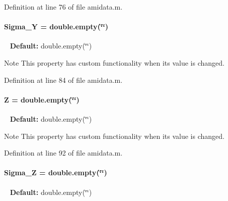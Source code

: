 Definition at line 76 of file amidata.\+m.

\hypertarget{classamidata_a4bd82fb17b03a0039c2f0347ec8dc393}{}
\paragraph[{Sigma\+\_\+\+Y}]{\setlength{\rightskip}{0pt plus 5cm}Sigma\+\_\+\+Y = double.\+empty(\char`\"{}\char`\"{})}\label{classamidata_a4bd82fb17b03a0039c2f0347ec8dc393}
~\newline
{\bfseries Default\+:} double.\+empty(\char`\"{}\char`\"{})

\begin{DoxyNote}{Note}
This property has custom functionality when its value is changed. 
\end{DoxyNote}


Definition at line 84 of file amidata.\+m.

\hypertarget{classamidata_adc18d83abfd9f87d396e8fd6b6ac0fe1}{}
\paragraph[{Z}]{\setlength{\rightskip}{0pt plus 5cm}Z = double.\+empty(\char`\"{}\char`\"{})}\label{classamidata_adc18d83abfd9f87d396e8fd6b6ac0fe1}
~\newline
{\bfseries Default\+:} double.\+empty(\char`\"{}\char`\"{})

\begin{DoxyNote}{Note}
This property has custom functionality when its value is changed. 
\end{DoxyNote}


Definition at line 92 of file amidata.\+m.

\hypertarget{classamidata_a77b1f0ddcfbfb895b17d62a414d35673}{}
\paragraph[{Sigma\+\_\+\+Z}]{\setlength{\rightskip}{0pt plus 5cm}Sigma\+\_\+\+Z = double.\+empty(\char`\"{}\char`\"{})}\label{classamidata_a77b1f0ddcfbfb895b17d62a414d35673}
~\newline
{\bfseries Default\+:} double.\+empty(\char`\"{}\char`\"{})

